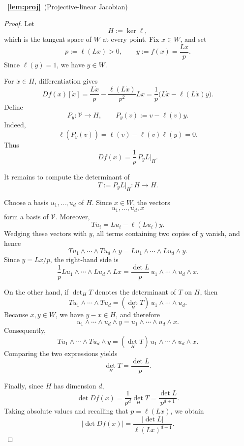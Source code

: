 \documentclass[11pt]{article}
\begin{document}
~{\bf \ref{lem:proj}}~(Projective-linear Jacobian)
\begin{proof}
Let
\[
H:=\ker\ell,
\]
which is the tangent space of \(W\) at every point. Fix
\(x\in W\), and set
\[
p:=\ell(Lx)>0,
\qquad
y:=f(x)=\frac{Lx}{p}.
\]
Since \(\ell(y)=1\), we have \(y\in W\).

For \(\dot x\in H\), differentiation gives
\[
Df(x)[\dot x]
=
\frac{L\dot x}{p}
-
\frac{\ell(L\dot x)}{p^2}Lx
=
\frac{1}{p}
\bigl(
L\dot x-\ell(L\dot x)y
\bigr).
\]
Define
\[
P_y:\mathcal V\longrightarrow H,
\qquad
P_y(v):=v-\ell(v)y.
\]
Indeed,
\[
\ell(P_y(v))
=
\ell(v)-\ell(v)\ell(y)
=
0.
\]
Thus
\[
Df(x)
=
\frac{1}{p}\,P_yL\big|_H.
\]

It remains to compute the determinant of
\[
T:=P_yL\big|_H:H\longrightarrow H.
\]

Choose a basis \(u_1,\ldots,u_d\) of \(H\). Since \(x\in W\),
the vectors
\[
u_1,\ldots,u_d,x
\]
form a basis of \(\mathcal V\). Moreover,
\[
Tu_i
=
Lu_i-\ell(Lu_i)y.
\]
Wedging these vectors with \(y\), all terms containing two copies of
\(y\) vanish, and hence
\[
Tu_1\wedge\cdots\wedge Tu_d\wedge y
=
Lu_1\wedge\cdots\wedge Lu_d\wedge y.
\]
Since \(y=Lx/p\), the right-hand side is
\[
\frac{1}{p}
Lu_1\wedge\cdots\wedge Lu_d\wedge Lx
=
\frac{\det L}{p}\,
u_1\wedge\cdots\wedge u_d\wedge x.
\]

On the other hand, if \(\det_H T\) denotes the determinant of \(T\) on
\(H\), then
\[
Tu_1\wedge\cdots\wedge Tu_d
=
(\det_H T)\,
u_1\wedge\cdots\wedge u_d.
\]
Because \(x,y\in W\), we have \(y-x\in H\), and therefore
\[
u_1\wedge\cdots\wedge u_d\wedge y
=
u_1\wedge\cdots\wedge u_d\wedge x.
\]
Consequently,
\[
Tu_1\wedge\cdots\wedge Tu_d\wedge y
=
(\det_H T)\,
u_1\wedge\cdots\wedge u_d\wedge x.
\]
Comparing the two expressions yields
\[
\det_H T
=
\frac{\det L}{p}.
\]

Finally, since \(H\) has dimension \(d\),
\[
\det Df(x)
=
\frac{1}{p^d}\det_H T
=
\frac{\det L}{p^{d+1}}.
\]
Taking absolute values and recalling that \(p=\ell(Lx)\), we obtain
\[
\left|\det Df(x)\right|
=
\frac{|\det L|}
{\ell(Lx)^{d+1}}.
\]
\end{proof}
\end{document}
